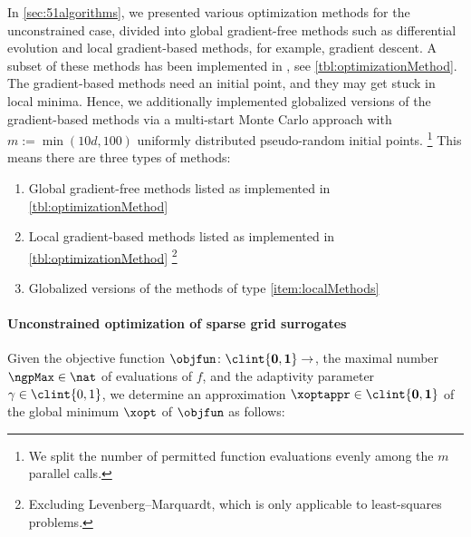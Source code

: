 In \cref{sec:51algorithms}, we presented various optimization methods
for the unconstrained case,
divided into global gradient-free methods such as differential evolution and
local gradient-based methods, for example, gradient descent.
A subset of these methods has been implemented in \sgpp{}
\cite{Pflueger10Spatially}, see \cref{tbl:optimizationMethod}.
The gradient-based methods need an initial point, and
they may get stuck in local minima.
Hence, we additionally implemented globalized versions
of the gradient-based methods
via a multi-start Monte Carlo approach with $m := \min(10d, 100)$
uniformly distributed pseudo-random initial points.%
\footnote{%
  We split the number of permitted function evaluations evenly
  among the $m$ parallel calls.%
}
This means there are three types of methods:

\begin{enumerate}[label=T\arabic*.,ref=T\arabic*,leftmargin=2.7em]
  \item
  \label{item:globalMethods}
  Global gradient-free methods listed as implemented in
  \cref{tbl:optimizationMethod}
  
  \item
  \label{item:localMethods}
  Local gradient-based methods listed as implemented in
  \cref{tbl:optimizationMethod}%
  \footnote{%
     Excluding Levenberg--Marquardt, which is only applicable
     to least-squares problems.%
  }
  
  \item
  \label{item:globalizedMethods}
  Globalized versions of the methods of type \ref{item:localMethods}
\end{enumerate}

\paragraph{Unconstrained optimization of sparse grid surrogates}

Given the objective function $\objfun\colon \clint{\*0, \*1} \to \real$,
the maximal number $\ngpMax \in \nat$ of evaluations of $f$, and
the adaptivity parameter $\gamma \in \clint{0, 1}$,
we determine an approximation $\xoptappr \in \clint{\*0, \*1}$
of the global minimum $\xopt$ of $\objfun$ as follows:

